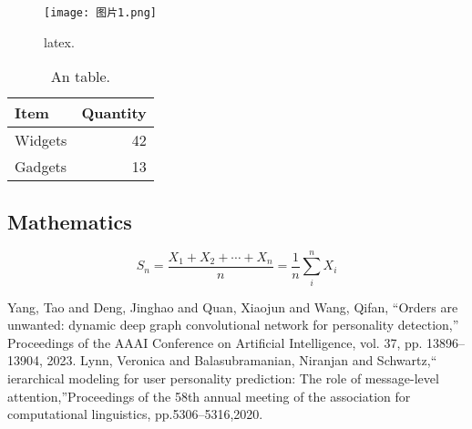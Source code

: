\documentclass{article}
\begin{document}
\begin{figure}
\centering
\texttt{[image: 图片1.png]}
\caption{\label{fig:图片}latex.}
\end{figure}

\begin{table}
\centering
\begin{tabular}{l|r}
Item & Quantity \\\hline
Widgets & 42 \\
Gadgets & 13
\end{tabular}
\caption{\label{tab:widgets}An table.}
\end{table}

\subsection{Mathematics}
\[S_n = \frac{X_1 + X_2 + \cdots + X_n}{n}
      = \frac{1}{n}\sum_{i}^{n} X_i\]




\begin{thebibliography}{99}   
    Yang, Tao and Deng, Jinghao and Quan, Xiaojun and Wang, Qifan,
“Orders are unwanted: dynamic deep graph convolutional network
for personality detection,” Proceedings of the AAAI Conference on
Artificial Intelligence, vol. 37, pp. 13896–13904, 2023.
    Lynn, Veronica and Balasubramanian, Niranjan and Schwartz,“ ierarchical modeling for user personality prediction: The role of message-level attention,”Proceedings of the 58th annual meeting of the association for
computational linguistics, pp.5306–5316,2020.
\end{thebibliography}
\end{document}
